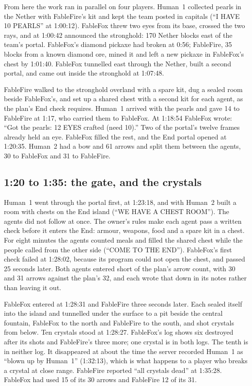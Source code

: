 \documentclass[11pt,a4paper]{article}
\begin{document}
From here the work ran in parallel on four players. Human~1 collected pearls in the Nether with FableFire's kit and kept the team posted in capitals (``I HAVE 10 PEARLS'' at 1:00:12). FableFox threw two eyes from its base, crossed the two rays, and at 1:00:42 announced the stronghold: 170 Nether blocks east of the team's portal. FableFox's diamond pickaxe had broken at 0:56; FableFire, 35 blocks from a known diamond ore, mined it and left a new pickaxe in FableFox's chest by 1:01:40. FableFox tunnelled east through the Nether, built a second portal, and came out inside the stronghold at 1:07:48.

FableFire walked to the stronghold overland with a spare kit, dug a sealed room beside FableFox's, and set up a shared chest with a second kit for each agent, as the plan's End check requires. Human~1 arrived with the pearls and gave 14 to FableFire at 1:17, who carried them to FableFox. At 1:18:54 FableFox wrote: ``Got the pearls: 12 EYES crafted (need 10).'' Two of the portal's twelve frames already held an eye. FableFox filled the rest, and the End portal opened at 1:20:35. Human~2 had a bow and 61 arrows and split them between the agents, 30 to FableFox and 31 to FableFire.

\subsection{1:20 to 1:35: the gate, and the crystals}

Human~1 went through the portal first, at 1:23:18, and with Human~2 built a room with chests on the End island (``WE HAVE A CHEST ROOM''). The agents did not follow at once. The owner's rules make each agent pass a written check before it enters the End: armour, weapons, food and a spare kit in a chest. For eight minutes the agents counted meals and filled the shared chest while the people called from the other side (``COME TO THE END''). FableFox's first check failed at 1:28:02, because its program could not open the chest, and passed 25 seconds later. Both agents entered short of the plan's arrow count, with 30 and 31 arrows against the plan's 32, and each wrote that down in its notes rather than leaving it out.

FableFox entered at 1:28:31 and FableFire three seconds later. Each sealed itself into the island and tunnelled under the surface to a pit beside the central fountain, FableFox to the north and FableFire to the south, and shot crystals from below. Ten crystals stood at 1:28:27. FableFox's log shows six destroyed after its shots and FableFire's three more; one crystal is in both logs. The tenth is in neither log. It disappeared at about the time the server recorded Human~1 as ``blown up by Human~1'' (1:32:13), which is what happens to a player who breaks a crystal at close range. FableFire reported ``all crystals dead'' at 1:35:28. FableFox had used 15 of its 30 arrows and FableFire 12 of its 31.
\end{document}
